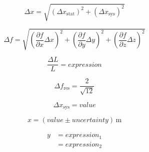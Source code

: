 \documentclass[a4paper, 12pt]{article}
\begin{document}
\begin{equation}
    \Delta x = \sqrt{\left(\Delta x_{\mathrm{stat}}\right)^2 + \left(\Delta x_{\mathrm{sys}}\right)^2}
    \label{eq:combined_uncertainty}
\end{equation}  

\begin{equation}
    \Delta f = \sqrt{\left(\frac{\partial f}{\partial x} \Delta x\right)^2 + \left(\frac{\partial f}{\partial y} \Delta y\right)^2 + \left(\frac{\partial f }{\partial z} \Delta z\right)^2 }
    \label{eq:error_propagation}
\end{equation}



\begin{equation}
    \frac{\Delta L}{L} = expression
    \label{eq:relative_uncertainty}
\end{equation}

\begin{equation}
    \Delta f_{\mathrm{res}} = \frac{2}{\sqrt{12}}
    \label{eq:resolution_uncertainty}
\end{equation}


\begin{equation}
    \Delta x_{\mathrm{sys}} = value
    \label{eq:manufacturer_uncertainty}
\end{equation}

\begin{equation}
    x = (value \pm uncertainty)\,\si{\meter}
    \label{eq:result}
\end{equation}


\begin{align}
    y &= expression_1 \\
           &= expression_2
    \label{eq:derivation}
\end{align}
\end{document}
